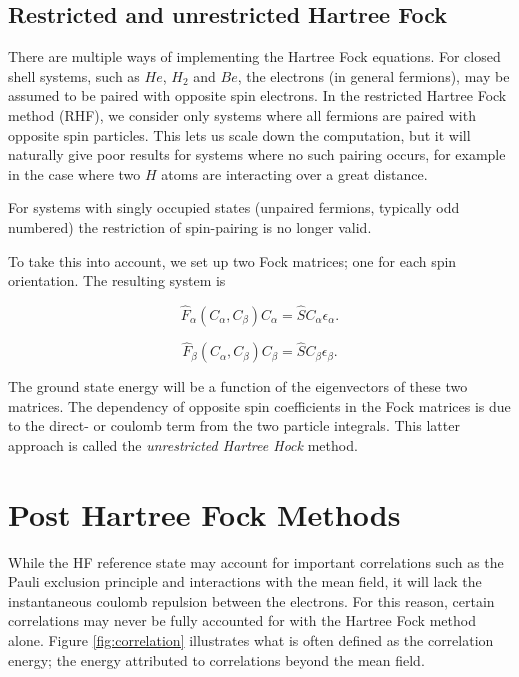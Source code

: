 \subsection{Restricted and unrestricted Hartree Fock}

There are multiple ways of implementing the Hartree Fock equations. For closed shell systems, such as $He$, $H_2$ and $Be$, the electrons (in general fermions), may be assumed to be paired with opposite spin electrons. In the restricted Hartree Fock method (RHF), we consider only systems where all fermions are paired with opposite spin particles. This lets us scale down the computation, but it will naturally give poor results for systems where no such pairing occurs, for example in the case where two $H$ atoms are interacting over a great distance.

For systems with singly occupied states (unpaired fermions, typically odd numbered) the restriction of spin-pairing is no longer valid.

To take this into account, we set up two Fock matrices; one for each spin orientation. The resulting system is

\begin{equation}
\hat{F}_\alpha(C_\alpha, C_\beta) C_\alpha = \hat{S} C_\alpha \epsilon_\alpha.
\end{equation}

\begin{equation}
\hat{F}_\beta(C_\alpha, C_\beta) C_\beta = \hat{S} C_\beta \epsilon_\beta.
\end{equation}

The ground state energy will be a function of the eigenvectors of these two matrices. The dependency of opposite spin coefficients in the Fock matrices is due to the direct- or coulomb term from the two particle integrals. \cite[p.241]{Szabo} This latter approach is called the \emph{unrestricted Hartree Hock} method.



\section{Post Hartree Fock Methods}

While the HF reference state may account for important correlations such as the Pauli exclusion principle and interactions with the mean field, it will lack the instantaneous coulomb repulsion between the electrons. For this reason, certain correlations may never be fully accounted for with the Hartree Fock method alone. Figure \ref{fig:correlation}  illustrates what is often defined as the correlation energy; the energy attributed to correlations beyond the mean field.

